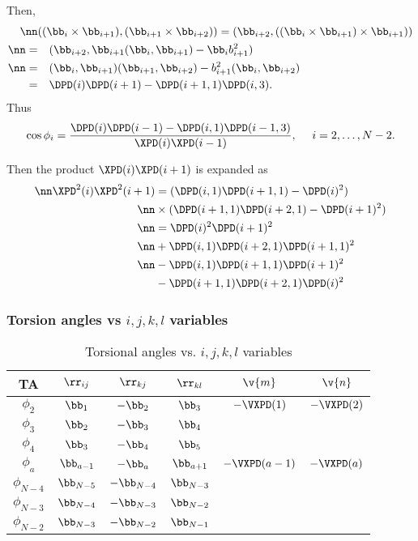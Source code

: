 Then,
\begin{align}
\nn&((\bb_i\times\bb_{i+1}),(\bb_{i+1}\times\bb_{i+2}))=
(\bb_{i+2},((\bb_i\times\bb_{i+1})\times\bb_{i+1}))\\
\nn=&\quad(\bb_{i+2},\bb_{i+1}(\bb_i,\bb_{i+1})-\bb_ib_{i+1}^2)\\
\nn=&\quad(\bb_i,\bb_{i+1})(\bb_{i+1},\bb_{i+2})-b_{i+1}^2(\bb_i,\bb_{i+2})\\
=&\quad\DPD(i)\DPD(i+1)-\DPD(i+1,1)\DPD(i,3).
\end{align}
Thus
\begin{equation}
  \cos\phi_{i}=\frac{\DPD(i)\DPD(i-1)-\DPD(i,1)\DPD(i-1,3)}{\XPD(i)\XPD(i-1)},
  \quad\ i=2,\ldots,N-2.
  \label{bln-def-tangle}
\end{equation}


Then the product $\XPD(i)\XPD(i+1)$ is expanded as
\begin{align}
  \nn\XPD^2(i)\XPD^2(i+1)&={(\DPD(i,1)\DPD(i+1,1)-\DPD(i)^2)}\\
  \nn&\times{(\DPD(i+1,1)\DPD(i+2,1)-\DPD(i+1)^2)}\\
  \nn&=\DPD(i)^2\DPD(i+1)^2\\
  \nn&+\DPD(i,1)\DPD(i+2,1)\DPD(i+1,1)^2\\
  \nn&-\DPD(i,1)\DPD(i+1,1)\DPD(i+1)^2\\
  &-\DPD(i+1,1)\DPD(i+2,1)\DPD(i)^2
\end{align}

\subsubsection{Torsion angles vs $i, j, k, l$ variables }

\begin{table}
  \centering
  \caption{Torsional angles vs. $i, j, k, l$ variables}
  \begin{tabular}{|*{6}{c|}}
\hline
TA 		& $\rr_{ij}$ 	& $\rr_{kj}$ 	& $\rr_{kl}$	& $\v{m}$	& $\v{n}$	  	\\
\hline
$\phi_2$	& $\bb_1$	& $-\bb_2$ 	& $\bb_3$	& $-\VXPD(1)$ 	& $-\VXPD(2)$ 		\\
$\phi_3$	& $\bb_2$	& $-\bb_3$	& $\bb_4$		\\
$\phi_4$	& $\bb_3$	& $-\bb_4$	& $\bb_5$		\\
$\phi_a$	& $\bb_{a-1}$	& $-\bb_a$	& $\bb_{a+1}$	& $-\VXPD(a-1)$ & $-\VXPD(a)$ 		\\
$\phi_{N-4}$	& $\bb_{N-5}$	& $-\bb_{N-4}$	& $\bb_{N-3}$		\\
$\phi_{N-3}$	& $\bb_{N-4}$	& $-\bb_{N-3}$	& $\bb_{N-2}$		\\
$\phi_{N-2}$	& $\bb_{N-3}$	& $-\bb_{N-2}$	& $\bb_{N-1}$		\\
\hline
  \end{tabular}
\end{table}

\clearpage

